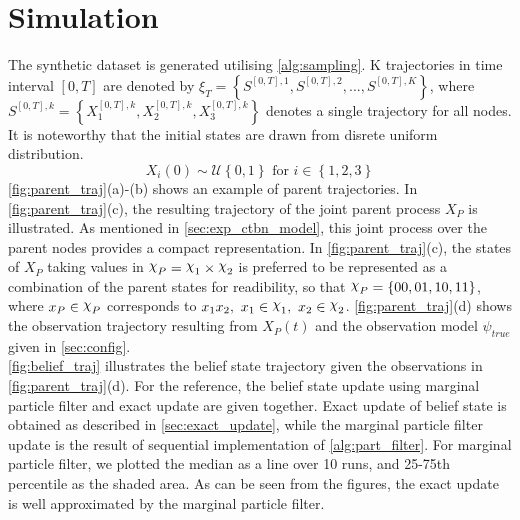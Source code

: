 \section{Simulation}
\label{sec:simulation}
The synthetic dataset is generated utilising \cref{alg:sampling}. K trajectories in time interval $ [0, T] $ are denoted by $ \xi_T = \left\lbrace S^{[0,T], 1}, S^{[0,T], 2}, ..., S^{[0,T], K} \right\rbrace  $, where $ S^{[0,T],k} = \left\lbrace X_1^{[0,T],k} , X_2^{[0,T],k}, X_3^{[0,T],k}\right\rbrace $ denotes a single trajectory for all nodes. It is noteworthy that the initial states are drawn from disrete uniform distribution.
\begin{equation}
X_i(0) \sim \mathcal{U} \left\lbrace 0, 1\right\rbrace  \text{ for } i \in \left\lbrace 1,2,3\right\rbrace 
\end{equation}
\autoref{fig:parent_traj}(a)-(b) shows an example of parent trajectories. In \autoref{fig:parent_traj}(c), the resulting trajectory of the joint parent process $ X_P $ is illustrated. As mentioned in \cref{sec:exp_ctbn_model}, this joint process over the parent nodes provides a compact representation. In \autoref{fig:parent_traj}(c), the states of $ X_P $ taking values in $ \rchi_P = \rchi_1 \times \rchi_2 $ is preferred to be represented as a combination of the parent states for readibility, so that $ \rchi_P = \left\lbrace 00, 01, 10, 11\right\rbrace  $, where $ x_P \in \rchi_P $ corresponds to $ x_1x_2,\ x_1\in \rchi_1,\  x_2\in \rchi_2 $. \autoref{fig:parent_traj}(d) shows the observation trajectory resulting from $ X_P(t) $ and the observation model $ \psi_{true} $ given in \cref{sec:config}. \\
\autoref{fig:belief_traj} illustrates the belief state trajectory given the observations in \autoref{fig:parent_traj}(d). For the reference, the belief state update using marginal particle filter and exact update are given together. Exact update of belief state is obtained as described in \cref{sec:exact_update}, while the marginal particle filter update is the result of sequential implementation of \cref{alg:part_filter}. For marginal particle filter, we plotted the median as a line over 10 runs, and 25-75th percentile as the shaded area. As can be seen from the figures, the exact update is well approximated by the marginal particle filter.
